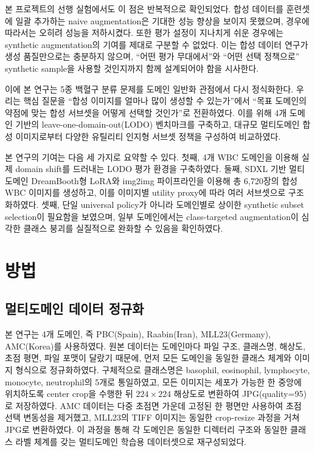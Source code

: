 \documentclass[11pt]{article}
\begin{document}
본 프로젝트의 선행 실험에서도 이 점은 반복적으로 확인되었다. 합성 데이터를 훈련셋에 일괄 추가하는 naive augmentation은 기대한 성능 향상을 보이지 못했으며, 경우에 따라서는 오히려 성능을 저하시켰다. 또한 평가 설정이 지나치게 쉬운 경우에는 synthetic augmentation의 기여를 제대로 구분할 수 없었다. 이는 합성 데이터 연구가 생성 품질만으로는 충분하지 않으며, ``어떤 평가 무대에서''와 ``어떤 선택 정책으로'' synthetic sample을 사용할 것인지까지 함께 설계되어야 함을 시사한다.

이에 본 연구는 5종 백혈구 분류 문제를 도메인 일반화 관점에서 다시 정식화한다. 우리는 핵심 질문을 ``합성 이미지를 얼마나 많이 생성할 수 있는가''에서 ``목표 도메인의 약점에 맞는 합성 서브셋을 어떻게 선택할 것인가''로 전환하였다. 이를 위해 4개 도메인 기반의 leave-one-domain-out(LODO) 벤치마크를 구축하고, 대규모 멀티도메인 합성 이미지로부터 다양한 유틸리티 인지형 서브셋 정책을 구성하여 비교하였다.

본 연구의 기여는 다음 세 가지로 요약할 수 있다. 첫째, 4개 WBC 도메인을 이용해 실제 domain shift를 드러내는 LODO 평가 환경을 구축하였다. 둘째, SDXL 기반 멀티도메인 DreamBooth형 LoRA와 img2img 파이프라인을 이용해 총 6,720장의 합성 WBC 이미지를 생성하고, 이를 이미지별 utility proxy에 따라 여러 서브셋으로 구조화하였다. 셋째, 단일 universal policy가 아니라 도메인별로 상이한 synthetic subset selection이 필요함을 보였으며, 일부 도메인에서는 class-targeted augmentation이 심각한 클래스 붕괴를 실질적으로 완화할 수 있음을 확인하였다.

\section{방법}

\subsection{멀티도메인 데이터 정규화}

본 연구는 4개 도메인, 즉 PBC(Spain), Raabin(Iran), MLL23(Germany), AMC(Korea)를 사용하였다. 원본 데이터는 도메인마다 파일 구조, 클래스명, 해상도, 초점 평면, 파일 포맷이 달랐기 때문에, 먼저 모든 도메인을 동일한 클래스 체계와 이미지 형식으로 정규화하였다. 구체적으로 클래스명은 basophil, eosinophil, lymphocyte, monocyte, neutrophil의 5개로 통일하였고, 모든 이미지는 세포가 가능한 한 중앙에 위치하도록 center crop을 수행한 뒤 $224 \times 224$ 해상도로 변환하여 JPG(quality=95)로 저장하였다. AMC 데이터는 다중 초점면 가운데 고정된 한 평면만 사용하여 초점 선택 변동성을 제거했고, MLL23의 TIFF 이미지는 동일한 crop-resize 과정을 거쳐 JPG로 변환하였다. 이 과정을 통해 각 도메인은 동일한 디렉터리 구조와 동일한 클래스 라벨 체계를 갖는 멀티도메인 학습용 데이터셋으로 재구성되었다.
\end{document}
